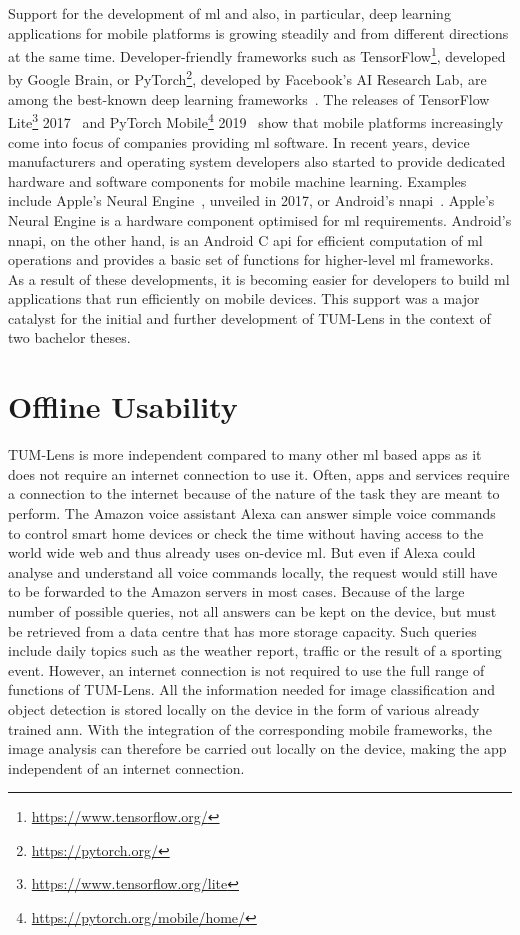 \documentclass[
			   fontsize=11pt,
               paper=a4,
               bibliography=totoc,
               idxtotoc,
               headsepline,
               footsepline,
               footinclude=false,
               BCOR=12mm,
               DIV=13,
               openany,   %
               ]
               {scrbook}
\begin{document}
Support for the development of \gls{ml} and also, in particular, deep learning applications for mobile platforms is growing steadily and from different directions at the same time. Developer-friendly frameworks such as TensorFlow\footnote{\url{https://www.tensorflow.org/}}, developed by Google Brain, or PyTorch\footnote{\url{https://pytorch.org/}}, developed by Facebook's AI Research Lab, are among the best-known deep learning frameworks~\cite{dl_ranking_2018}. The releases of TensorFlow Lite\footnote{\url{https://www.tensorflow.org/lite}} 2017~\cite{tflite_release_verge_2017} and PyTorch Mobile\footnote{\url{https://pytorch.org/mobile/home/}} 2019~\cite{pytorch_release_2019} show that mobile platforms increasingly come into focus of companies providing \acrlong{ml} software. In recent years, device manufacturers and operating system developers also started to provide dedicated hardware and software components for mobile machine learning. Examples include Apple's Neural Engine~\cite{neural_engine_verge_2017}, unveiled in 2017, or Android's \gls{nnapi}~\cite{nnapi_devguide_2021}. Apple's Neural Engine is a hardware component optimised for \acrlong{ml} requirements. Android's \gls{nnapi}, on the other hand, is an Android C \gls{api} for efficient computation of \gls{ml} operations and provides a basic set of functions for higher-level \gls{ml} frameworks. As a result of these developments, it is becoming easier for developers to build \gls{ml} applications that run efficiently on mobile devices. This support was a major catalyst for the initial and further development of TUM-Lens in the context of two bachelor theses.

\section{Offline Usability} \label{sec:offline_usability}

TUM-Lens is more independent compared to many other \acrlong{ml} based apps as it does not require an internet connection to use it. Often, apps and services require a connection to the internet because of the nature of the task they are meant to perform. The Amazon voice assistant Alexa can answer simple voice commands to control smart home devices or check the time without having access to the world wide web and thus already uses on-device \acrlong{ml}. But even if Alexa could analyse and understand all voice commands locally, the request would still have to be forwarded to the Amazon servers in most cases. Because of the large number of possible queries, not all answers can be kept on the device, but must be retrieved from a data centre that has more storage capacity. Such queries include daily topics such as the weather report, traffic or the result of a sporting event. However, an internet connection is not required to use the full range of functions of TUM-Lens. All the information needed for image classification and object detection is stored locally on the device in the form of various already trained \gls{ann}. With the integration of the corresponding mobile frameworks, the image analysis can therefore be carried out locally on the device, making the app independent of an internet connection.
\end{document}
